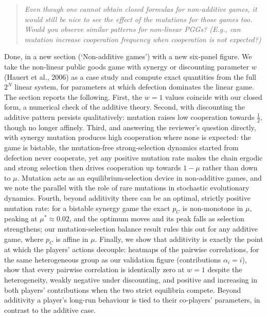 \documentclass[11pt]{article}
\newenvironment{reviewerquote}
  {\begin{quote}\itshape}
  {\end{quote}}
\begin{document}
\begin{reviewerquote}
Even though one cannot obtain closed formulas for non-additive games, it
would still be nice to see the effect of the mutations for those games too.
Would you observe similar patterns for non-linear PGGs? (E.g., can mutation
increase cooperation frequency when cooperation is not expected?)
\end{reviewerquote}

Done, in a new section (`Non-additive games') with a new six-panel figure.
We take the non-linear public goods game with synergy or discounting
parameter \(w\) (Hauert et al., 2006) as a case study and compute exact
quantities from the full \(2^N\) linear system, for parameters at which
defection dominates the linear game. The section reports the following.
First, the \(w=1\) values coincide with our closed form, a numerical check
of the additive theory. Second, with discounting the additive pattern
persists qualitatively: mutation raises low cooperation towards
\(\tfrac{1}{2}\), though no longer affinely. Third, and answering the
reviewer's question directly, with synergy mutation produces high
cooperation where none is expected: the game is bistable, the mutation-free
strong-selection dynamics started from defection never cooperate, yet any
positive mutation rate makes the chain ergodic and strong selection then
drives cooperation up towards \(1-\mu\) rather than down to \(\mu\).
Mutation acts as an equilibrium-selection device in non-additive games, and
we note the parallel with the role of rare mutations in stochastic
evolutionary dynamics. Fourth, beyond additivity there can be an optimal,
strictly positive mutation rate: for a bistable synergy game the exact
\(p_C\) is non-monotone in \(\mu\), peaking at \(\mu^*\approx0.02\), and
the optimum moves and its peak falls as selection strengthens; our
mutation-selection balance result rules this out for any additive game,
where \(p_C\) is affine in \(\mu\). Finally, we show that additivity is
exactly the point at which the players' actions decouple: heatmaps of the
pairwise correlations, for the same heterogeneous group as our validation
figure (contributions \(\alpha_i=i\)), show that every pairwise correlation
is identically zero at \(w=1\) despite the heterogeneity, weakly negative
under discounting, and positive and increasing in both players'
contributions when the two strict equilibria compete. Beyond additivity a
player's long-run behaviour is tied to their co-players' parameters, in
contrast to the additive case.
\end{document}
